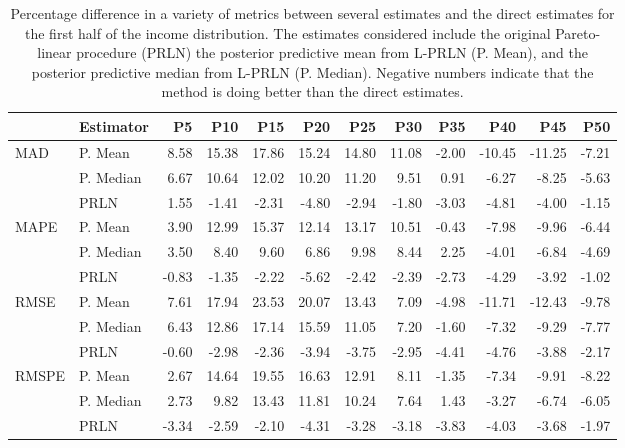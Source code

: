 \documentclass[12pt]{article}
\begin{document}
\begin{table}[ht]
\centering
{\footnotesize
\begin{tabular}{llrrrrrrrrrr}
      \hline
      & Estimator & P5 & P10 & P15 & P20 & P25 & P30 & P35 & P40 & P45 & P50 \\
      \hline
      MAD & P. Mean & 8.58 & 15.38 & 17.86 & 15.24 & 14.80 & 11.08 & -2.00 & -10.45 & -11.25 & -7.21 \\
      & P. Median & 6.67 & 10.64 & 12.02 & 10.20 & 11.20 & 9.51 & 0.91 & -6.27 & -8.25 & -5.63 \\
      & PRLN & 1.55 & -1.41 & -2.31 & -4.80 & -2.94 & -1.80 & -3.03 & -4.81 & -4.00 & -1.15 \\ \hline
      MAPE & P. Mean & 3.90 & 12.99 & 15.37 & 12.14 & 13.17 & 10.51 & -0.43 & -7.98 & -9.96 & -6.44 \\
      & P. Median & 3.50 & 8.40 & 9.60 & 6.86 & 9.98 & 8.44 & 2.25 & -4.01 & -6.84 & -4.69 \\
      & PRLN & -0.83 & -1.35 & -2.22 & -5.62 & -2.42 & -2.39 & -2.73 & -4.29 & -3.92 & -1.02 \\ \hline
      RMSE & P. Mean & 7.61 & 17.94 & 23.53 & 20.07 & 13.43 & 7.09 & -4.98 & -11.71 & -12.43 & -9.78 \\
      & P. Median & 6.43 & 12.86 & 17.14 & 15.59 & 11.05 & 7.20 & -1.60 & -7.32 & -9.29 & -7.77 \\
      & PRLN & -0.60 & -2.98 & -2.36 & -3.94 & -3.75 & -2.95 & -4.41 & -4.76 & -3.88 & -2.17 \\ \hline
      RMSPE & P. Mean & 2.67 & 14.64 & 19.55 & 16.63 & 12.91 & 8.11 & -1.35 & -7.34 & -9.91 & -8.22 \\
      & P. Median & 2.73 & 9.82 & 13.43 & 11.81 & 10.24 & 7.64 & 1.43 & -3.27 & -6.74 & -6.05 \\
      & PRLN & -3.34 & -2.59 & -2.10 & -4.31 & -3.28 & -3.18 & -3.83 & -4.03 & -3.68 & -1.97 \\
      \hline
\end{tabular}
  }
\caption{Percentage difference in a variety of metrics between several estimates and the direct estimates for the first half of the income distribution. The estimates considered include the original Pareto-linear procedure (PRLN) the posterior predictive mean from L-PRLN (P. Mean), and the posterior predictive median from L-PRLN (P. Median). Negative numbers indicate that the method is doing better than the direct estimates.}
\label{tab:sim}
\end{table}
\end{document}
